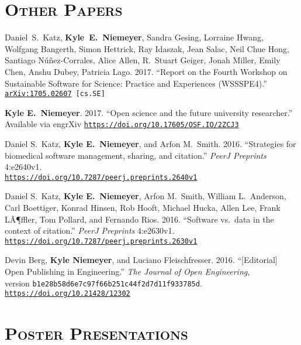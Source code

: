 \documentclass[margin,line,11pt]{res}
\makeatletter
\newlength{\bibhang}
\newlength{\bibsep}
 {\@listi \global\bibsep\itemsep \global\advance\bibsep by\parsep}
\newenvironment{bibenum*}
  {\renewcommand\labelenumi{\theenumi.}%
   \etaremune[
     topsep=0pt,
     itemsep=\bibsep,
     parsep=0pt,partopsep=0pt,
     itemindent=-\bibhang,
     leftmargin={\bibhang+\widthof{[999]}}]}
  {\endetaremune}
\newcommand*{\doi}[1]{\href{https://doi.org/#1}{\nolinkurl{https://doi.org/#1}}}
\makeatother
\begin{document}
\begin{resume}
\section{\textsc{Other Papers}}

\begin{bibenum*}

\item Daniel~S.~Katz, \textbf{Kyle~E.~Niemeyer}, Sandra Gesing, Lorraine Hwang,
Wolfgang Bangerth, Simon Hettrick, Ray Idaszak, Jean Salac, Neil Chue Hong,
Santiago N\'u\~nez-Corrales, Alice Allen, R.~Stuart Geiger, Jonah Miller,
Emily Chen, Anshu Dubey, Patricia Lago.
2017.
``Report on the Fourth Workshop on Sustainable Software for Science: Practice and Experiences (WSSSPE4).''
{\tt \href{https://arxiv.org/abs/1705.02607}{arXiv:1705.02607} [cs.SE]}

\item \textbf{Kyle E.~Niemeyer}.
2017.
``Open science and the future university researcher.''
Available via engrXiv \doi{10.17605/OSF.IO/2ZCJ3}

\item Daniel S.\ Katz, \textbf{Kyle E.~Niemeyer}, and Arfon M.\ Smith.
2016.
``Strategies for biomedical software management, sharing, and citation.''
\textit{PeerJ Preprints} 4:e2640v1. \\
\doi{10.7287/peerj.preprints.2640v1}

\item Daniel S.\ Katz, \textbf{Kyle E.~Niemeyer}, Arfon M.\ Smith, William L.\ Anderson,
Carl Boettiger, Konrad Hinsen, Rob Hooft, Michael Hucka, Allen Lee, Frank LÃ¶ffler,
Tom Pollard, and Fernando Rios.
2016.
``Software vs.\ data in the context of citation.''
\textit{PeerJ Preprints} 4:e2630v1.
\doi{10.7287/peerj.preprints.2630v1}

\item Devin Berg, \textbf{Kyle Niemeyer}, and Luciano Fleischfresser.
2016.
``[Editorial] Open Publishing in Engineering.''
\textit{The Journal of Open Engineering}, \\
version \texttt{b1e28b58d6e7c97f66b251c44f2d7d11f933785d}.
\doi{10.21428/12302}

\end{bibenum*}

\section{\textsc{Poster Presentations}}


\end{resume}
\end{document}
